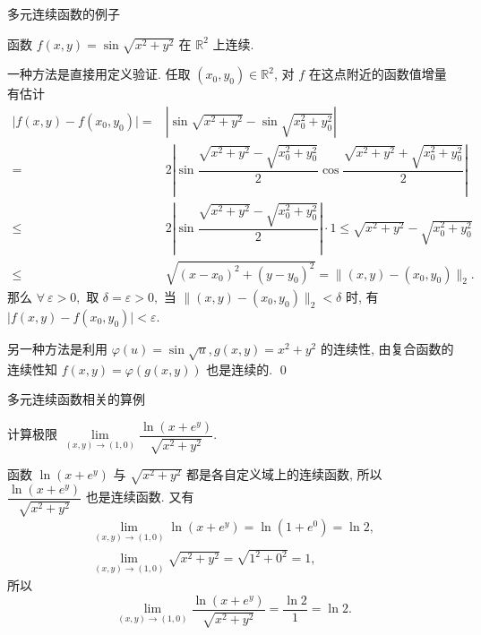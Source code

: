 
\begin{frame}{多元连续函数的例子}

\begin{eg}
函数 $f(x, y) = \sin \sqrt{x^2 + y^2}$ 在 $\mathbb{R}^2$ 上连续.
\end{eg}

\pause

\startproof[bg=yellow, fg=red]
一种方法是直接用定义验证.
\pause
任取 $(x_0, y_0) \in \mathbb{R}^2$, 对 $f$ 在这点附近的函数值增量有估计
\begin{align*}
\lvert f(x, y) - f(x_0, y_0) \rvert = & \left\lvert \sin \sqrt{x^2 + y^2} - \sin \sqrt{x_0^2 + y_0^2} \right\rvert \\
= & 2 \left\lvert \sin \dfrac{\sqrt{x^2 + y^2} - \sqrt{x_0^2 + y_0^2}}{2} \cos \dfrac{\sqrt{x^2 + y^2} + \sqrt{x_0^2 + y_0^2}}{2} \right\rvert \\
\leqslant & 2 \left\lvert \sin\dfrac{\sqrt{x^2 + y^2} - \sqrt{x_0^2 + y_0^2}}{2} \right\rvert \cdot 1  \leqslant \sqrt{x^2 + y^2} - \sqrt{x_0^2 + y_0^2} \\
\leqslant & \sqrt{(x - x_0)^2 + (y - y_0)^2} = \lVert (x, y) - (x_0, y_0) \rVert_2.
\end{align*}
\pause
那么 $\forall~\varepsilon > 0,$ 取 $\delta = \varepsilon > 0,$ 当 $\lVert (x, y) - (x_0, y_0) \rVert_2 < \delta$ 时, 有 $\lvert f(x, y) - f(x_0, y_0) \rvert < \varepsilon.$

\pause
\vspace{0.5em}

另一种方法是利用 $\varphi(u) = \sin \sqrt{u}, g(x, y) = x^2 + y^2$ 的连续性, 由复合函数的连续性知 $f(x, y) = \varphi(g(x, y))$ 也是连续的.
\qed

\end{frame}


\begin{frame}{多元连续函数相关的算例}

\begin{eg}
计算极限 $\lim\limits_{(x,y) \to (1,0)} \dfrac{\ln(x+e^y)}{\sqrt{x^2 + y^2}}$.
\end{eg}

\pause
\vspace{1em}

函数 $\ln(x+e^y)$ 与 $\sqrt{x^2 + y^2}$ 都是各自定义域上的连续函数, 所以 $\dfrac{\ln(x+e^y)}{\sqrt{x^2 + y^2}}$ 也是连续函数. 又有
\begin{gather*}
\lim_{(x,y) \to (1,0)} \ln(x+e^y) = \ln(1+e^0) = \ln 2, \\
\lim_{(x,y) \to (1,0)} \sqrt{x^2 + y^2} = \sqrt{1^2 + 0^2} = 1,
\end{gather*}
所以
\[\lim_{(x,y) \to (1,0)} \dfrac{\ln(x+e^y)}{\sqrt{x^2 + y^2}} = \dfrac{\ln 2}{1} = \ln 2.\]

\end{frame}

